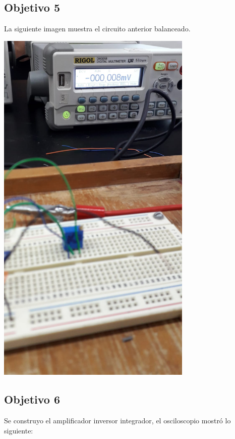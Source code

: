 \documentclass[DIV=calc, paper=a4, fontsize=11pt]{scrartcl}
\newenvironment{Figura}
  {\par\medskip\noindent\minipage{\linewidth}}
  {\endminipage\par\medskip}
\begin{document}
\begin{multicols}{2}
\subsection*{Objetivo 5}

La siguiente imagen muestra el circuito anterior balanceado.

\begin{Figura}
    \centering
    \includegraphics[width=0.7\textwidth]{Objetivo4Balancearimangen.jpeg}
    \label{fig}
\end{Figura}

\subsection*{Objetivo 6}

Se construyo el amplificador inversor integrador, el osciloscopio mostró lo siguiente:


\end{multicols}
\end{document}

